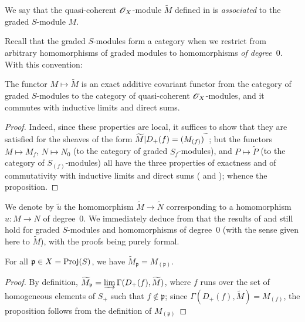 \begin{definition}[2.5.3]
\label{II.2.5.3}
We say that the quasi-coherent $\mathscr{O}_X$-module $\widetilde{M}$ defined in  is \emph{associated} to the graded $S$-module $M$.
\end{definition}

Recall that the graded $S$-modules form a category when we restrict from arbitrary homomorphisms of graded modules to homomorphisms \emph{of degree~$0$}.
With this convention:

\begin{proposition}[2.5.4]
\label{II.2.5.4}
The functor $M\mapsto\widetilde{M}$ is an exact additive covariant functor from the category of graded $S$-modules to the category of quasi-coherent $\mathscr{O}_X$-modules, and it commutes with inductive limits and direct sums.
\end{proposition}

\begin{proof}
Indeed, since these properties are local, it suffices to show that they are satisfied for the sheaves of the form $\widetilde{M}|D_+(f)=(M_{(f)})^{\,\widetilde{\,}\,}$;
but the functors $M\mapsto M_f$, $N\mapsto N_0$ (to the category of graded $S_f$-modules), and $P\mapsto\widetilde{P}$ (to the category of $S_{(f)}$-modules) all have the three properties of exactness and of commutativity with inductive limits and direct sums ( and );
whence the proposition.
\end{proof}

We denote by $\widetilde{u}$ the homomorphism $\widetilde{M}\to\widetilde{N}$ corresponding to a homomorphism $u: M\to N$ of degree~$0$.
We immediately deduce from  that the results of  and  still hold for graded $S$-modules and homomorphisms of degree~$0$ (with the sense given here to $\widetilde{M}$), with the proofs being purely formal.

\begin{proposition}[2.5.5]
\label{II.2.5.5}
For all $\mathfrak{p}\in X=\operatorname{Proj}(S)$, we have $\widetilde{M}_\mathfrak{p}=M_{(\mathfrak{p})}$.
\end{proposition}

\begin{proof}
By definition, $\widetilde{M}_\mathfrak{p}=\varinjlim\Gamma(D_+(f),\widetilde{M})$, where $f$ runs over the set of homogeneous elements of $S_+$ such that $f\not\in\mathfrak{p}$;
since $\Gamma(D_+(f),\widetilde{M})=M_{(f)}$, the proposition follows from the definition of $M_{(\mathfrak{p})}$ 
\end{proof}

